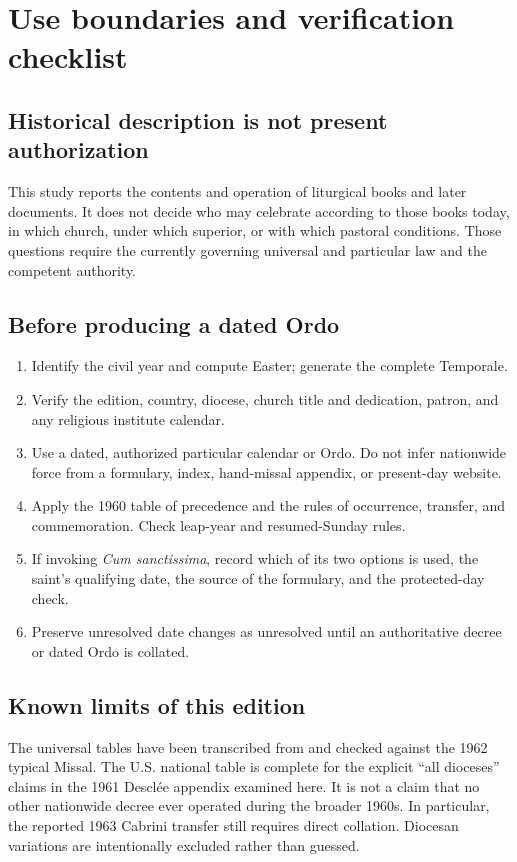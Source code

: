 \section{Use boundaries and verification checklist}

\subsection{Historical description is not present authorization}

This study reports the contents and operation of liturgical books and later documents. It does not decide who may celebrate according to those books today, in which church, under which superior, or with which pastoral conditions. Those questions require the currently governing universal and particular law and the competent authority.

\subsection{Before producing a dated Ordo}

\begin{enumerate}[leftmargin=1.7em,itemsep=0.35em]
\item Identify the civil year and compute Easter; generate the complete Temporale.
\item Verify the edition, country, diocese, church title and dedication, patron, and any religious institute calendar.
\item Use a dated, authorized particular calendar or Ordo. Do not infer nationwide force from a formulary, index, hand-missal appendix, or present-day website.
\item Apply the 1960 table of precedence and the rules of occurrence, transfer, and commemoration. Check leap-year and resumed-Sunday rules.
\item If invoking \emph{Cum sanctissima}, record which of its two options is used, the saint's qualifying date, the source of the formulary, and the protected-day check.
\item Preserve unresolved date changes as unresolved until an authoritative decree or dated Ordo is collated.
\end{enumerate}

\subsection{Known limits of this edition}

The universal tables have been transcribed from and checked against the 1962 typical Missal. The U.S. national table is complete for the explicit ``all dioceses'' claims in the 1961 Desclée appendix examined here. It is not a claim that no other nationwide decree ever operated during the broader 1960s. In particular, the reported 1963 Cabrini transfer still requires direct collation. Diocesan variations are intentionally excluded rather than guessed.
